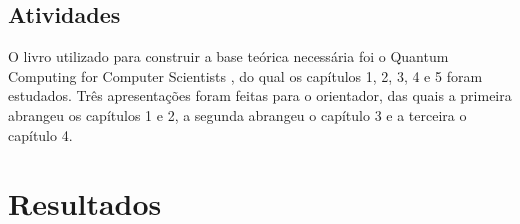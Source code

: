 \documentclass{imetex-inci}
\begin{document}
\section{Atividades}
O livro utilizado para construir a base teórica necessária foi o Quantum Computing for Computer Scientists  \cite{yanofsky}, do qual os capítulos 1, 2, 3, 4 e 5 foram estudados. Três apresentações foram feitas para o orientador, das quais a primeira abrangeu os capítulos 1 e 2, a segunda abrangeu o capítulo 3 e a terceira o capítulo 4.

\chapter{Resultados}

\printBackMatter

\end{document}
